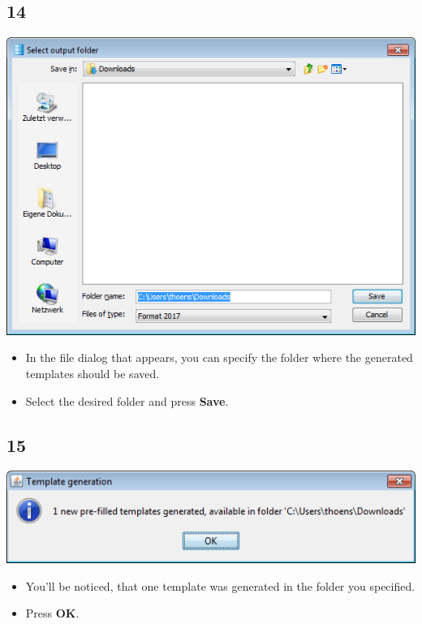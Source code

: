 \documentclass{beamer}
\begin{document}
\subsection{14}
\begin{frame}
	\begin{center}
  		\includegraphics[height=0.6\textheight]{14.png}
	\end{center}
	\begin{itemize}
		\item In the file dialog that appears, you can specify the folder where the generated templates should be saved.
		\item Select the desired folder and press \textbf{Save}.
	\end{itemize}
\end{frame}

\subsection{15}
\begin{frame}
	\begin{center}
  		\includegraphics[height=0.2\textheight]{15.png}
	\end{center}
	\begin{itemize}
		\item You'll be noticed, that one template was generated in the folder you specified.
		\item Press \textbf{OK}.
	\end{itemize}
\end{frame}
\end{document}
